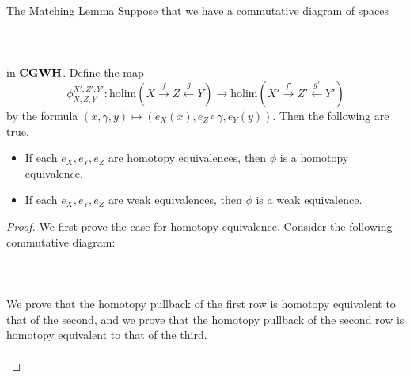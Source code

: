 \documentclass[a4paper]{article}
\begin{document}
\begin{thm}{The Matching Lemma}{} Suppose that we have a commutative diagram of spaces \\~\\
\\~\\
in $\bold{CGWH}$. Define the map $$\phi_{X,Z,Y}^{X',Z',Y'}:\text{holim}(X\overset{f}{\rightarrow}Z\overset{g}{\leftarrow}Y)\to\text{holim}(X'\overset{f'}{\rightarrow}Z'\overset{g'}{\leftarrow}Y')$$ by the formula $(x,\gamma,y)\mapsto(e_X(x),e_Z\circ\gamma,e_Y(y))$. Then the following are true. 
\begin{itemize}
\item If each $e_X,e_Y,e_Z$ are homotopy equivalences, then $\phi$ is a homotopy equivalence. 
\item If each $e_X,e_Y,e_Z$ are weak equivalences, then $\phi$ is a weak equivalence. 
\end{itemize} \tcbline
\begin{proof}
We first prove the case for homotopy equivalence. Consider the following commutative diagram: \\~\\
\\~\\
We prove that the homotopy pullback of the first row is homotopy equivalent to that of the second, and we prove that the homotopy pullback of the second row is homotopy equivalent to that of the third. \\~\\


\end{proof}
\end{thm}
\end{document}
